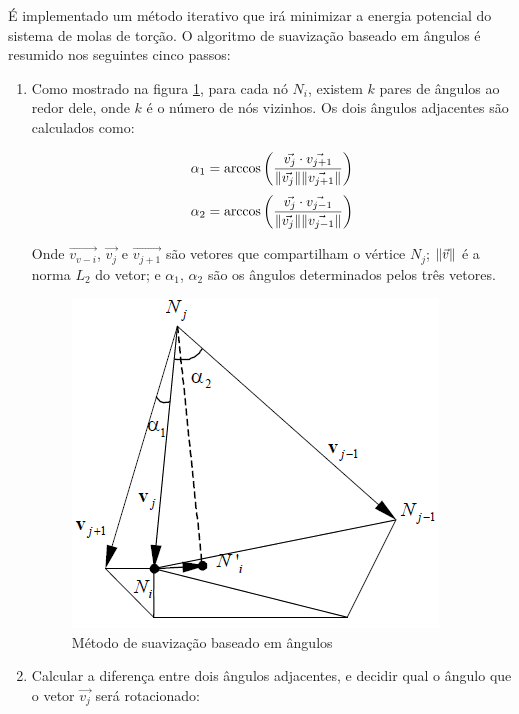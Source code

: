 É implementado um método iterativo que irá minimizar a energia potencial do sistema de molas de torção. O algoritmo de suavização baseado em ângulos é resumido nos seguintes cinco passos:

\begin{enumerate}
    \item Como mostrado na figura \ref{fig:angle-based}, para cada nó $N_i$, existem $k$ pares de ângulos ao redor dele, onde $k$ é o número de nós vizinhos. Os dois ângulos adjacentes são calculados como:
    
    \begin{equation*}
        \alpha_1 = \arccos{\qty(\frac{\vec{v_j} \cdot \vec{v_{j+1}}}{\norm{\vec{v_j}} \norm{\vec{v_{j+1}}} })}
    \end{equation*}
    \begin{equation*}
        \alpha_2 = \arccos{\qty(\frac{\vec{v_j} \cdot \vec{v_{j-1}}}{\norm{\vec{v_j}} \norm{\vec{v_{j-1}}} })}
    \end{equation*}

    Onde $\vec{v_{v-i}}$, $\vec{v_j}$ e $\vec{v_{j+1}}$ são vetores que compartilham o vértice $N_j$; $\norm{\vec{v}}$ é a norma $L_2$ do vetor; e $\alpha_1$, $\alpha_2$ são os ângulos determinados pelos três vetores.

    \begin{figure}[]
        \centering
        \includegraphics{fig/angle-based.png}
        \caption{Método de suavização baseado em ângulos}
        \label{fig:angle-based}
    \end{figure}

    \item Calcular a diferença entre dois ângulos adjacentes, e decidir qual o ângulo que o vetor $\vec{v_j}$ será rotacionado:
    

\end{enumerate}
